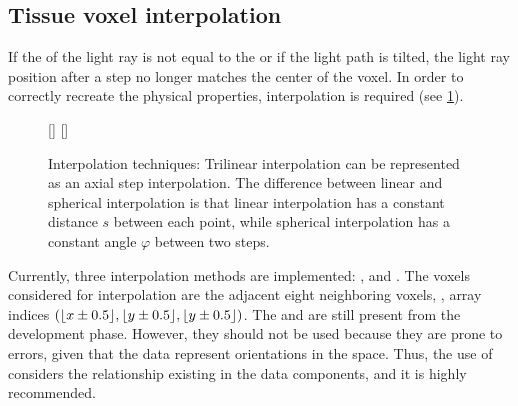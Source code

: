 \subsection{Tissue voxel interpolation}
%
If the \Stepsize{} of the light ray is not equal to the \Voxelsize{} or if the light path is tilted, the light ray position after a step no longer matches the center of the voxel.
In order to correctly recreate the physical properties, interpolation is required (see \cref{fig:vectorfield_disc}).
%
\begin{figure}[!t]
\centering
\setlength{\tikzwidth}{0.475\textwidth}
[\tikzwidth]{
\hfill{}\hfill}\hfill
{}
[\tikzwidth]{
}
\caption[]{Interpolation techniques: Trilinear interpolation can be represented as an axial step interpolation. The difference between linear and spherical interpolation is that linear interpolation has a constant distance $s$ between each point, while spherical interpolation has a constant angle $\varphi$ between two steps.}
\label{fig:vectorfield_disc}
\end{figure}
%
Currently, three interpolation methods are implemented: ,  and .
The voxels considered for interpolation are the adjacent eight neighboring voxels, \ie{}, array indices $(\lfloor x\pm0.5\rfloor,\lfloor y\pm0.5\rfloor,\lfloor y\pm0.5\rfloor)$.
The  and  are still present from the development phase.
However, they should not be used because they are prone to errors, given that the data represent orientations in the space.
Thus, the use of  considers the relationship existing in the data components, and it is highly recommended.
%
%
%
